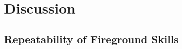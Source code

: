 \documentclass[12pt,oneside]{article}
\begin{document}


\section{Discussion}

\subsection{Repeatability of Fireground Skills}
\label{subsec:ff_repeatability}
\end{document}
